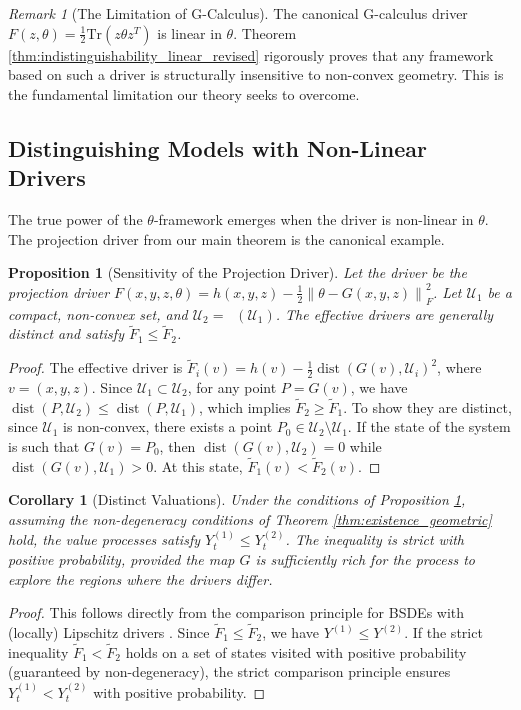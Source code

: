 \documentclass[12pt, letterpaper]{amsart}
\newcommand{\Ucal}{\mathcal{U}}
\newcommand{\norm}[1]{\left\lVert#1\right\rVert}
\newcommand{\Tr}{\mathrm{Tr}}
\DeclareMathOperator*{\dist}{dist}
\DeclareMathOperator*{\overlineconv}{\overline{conv}}
\theoremstyle{plain}
\newtheorem{proposition}[theorem]{Proposition}
\newtheorem{corollary}[theorem]{Corollary}
\theoremstyle{definition}
\theoremstyle{remark}
\newtheorem{remark}[theorem]{Remark}
\numberwithin{equation}{section} %
\begin{document}
\begin{remark}[The Limitation of G-Calculus]
The canonical G-calculus driver $F(z,\theta) = \frac{1}{2}\Tr(z\theta z^T)$ is linear in $\theta$. Theorem \ref{thm:indistinguishability_linear_revised} rigorously proves that any framework based on such a driver is structurally insensitive to non-convex geometry. This is the fundamental limitation our theory seeks to overcome.
\end{remark}

\subsection{Distinguishing Models with Non-Linear Drivers}
The true power of the $\theta$-framework emerges when the driver is non-linear in $\theta$. The projection driver from our main theorem is the canonical example.

\begin{proposition}[Sensitivity of the Projection Driver]
\label{prop:sensitivity_projection_revised}
Let the driver be the projection driver $F(x,y,z,\theta) = h(x,y,z) - \frac{1}{2}\norm{\theta - G(x,y,z)}_F^2$. Let $\Ucal_1$ be a compact, non-convex set, and $\Ucal_2 = \overlineconv(\Ucal_1)$. The effective drivers are generally distinct and satisfy $\tilde{F}_1 \le \tilde{F}_2$.
\end{proposition}
\begin{proof}
The effective driver is $\tilde{F}_i(v) = h(v) - \frac{1}{2} \dist(G(v), \Ucal_i)^2$, where $v=(x,y,z)$. Since $\Ucal_1 \subset \Ucal_2$, for any point $P=G(v)$, we have $\dist(P, \Ucal_2) \le \dist(P, \Ucal_1)$, which implies $\tilde{F}_2 \ge \tilde{F}_1$.
To show they are distinct, since $\Ucal_1$ is non-convex, there exists a point $P_0 \in \Ucal_2 \setminus \Ucal_1$. If the state of the system is such that $G(v) = P_0$, then $\dist(G(v), \Ucal_2)=0$ while $\dist(G(v), \Ucal_1) > 0$. At this state, $\tilde{F}_1(v) < \tilde{F}_2(v)$.
\end{proof}

\begin{corollary}[Distinct Valuations]
Under the conditions of Proposition \ref{prop:sensitivity_projection_revised}, assuming the non-degeneracy conditions of Theorem \ref{thm:existence_geometric} hold, the value processes satisfy $Y^{(1)}_t \le Y^{(2)}_t$. The inequality is strict with positive probability, provided the map $G$ is sufficiently rich for the process to explore the regions where the drivers differ.
\end{corollary}
\begin{proof}
This follows directly from the comparison principle for BSDEs with (locally) Lipschitz drivers \cite{Kobylanski2000}. Since $\tilde{F}_1 \le \tilde{F}_2$, we have $Y^{(1)} \le Y^{(2)}$. If the strict inequality $\tilde{F}_1 < \tilde{F}_2$ holds on a set of states visited with positive probability (guaranteed by non-degeneracy), the strict comparison principle ensures $Y^{(1)}_t < Y^{(2)}_t$ with positive probability.
\end{proof}
\end{document}
